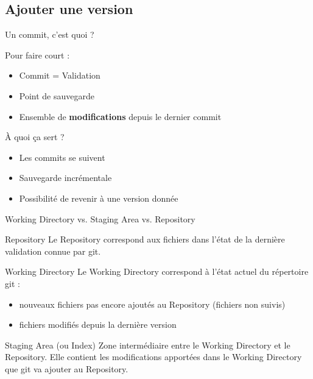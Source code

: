 \documentclass[usepdftitle=false]{beamer}
\begin{document}
\subsection{Ajouter une version}

\begin{frame}{Un commit, c'est quoi ?}

Pour faire court :
\begin{itemize}
\item Commit = Validation
\item Point de sauvegarde
\item Ensemble de \textbf{modifications} depuis le dernier commit
\end{itemize}

\bigskip

\`A quoi ça sert ?
\begin{itemize}
\item Les commits se suivent
\item Sauvegarde incrémentale
\item Possibilité de revenir à une version donnée
\end{itemize}
\end{frame}

\begin{frame}{Working Directory vs. Staging Area vs. Repository}
	\begin{block}{Repository}
		Le Repository correspond aux fichiers dans l'état de la dernière validation connue par git.
	\end{block}

	\begin{block}{Working Directory}
		Le Working Directory correspond à l'état actuel du répertoire git :
		\begin{itemize}
			\item nouveaux fichiers pas encore ajoutés au Repository (fichiers non suivis)
			\item fichiers modifiés depuis la dernière version
		\end{itemize}
	\end{block}

	\begin{block}{Staging Area (ou Index)}
		Zone intermédiaire entre le Working Directory et le Repository.
		Elle contient les modifications apportées dans le Working Directory que git va ajouter au Repository.
	\end{block}

\end{frame}
\end{document}

